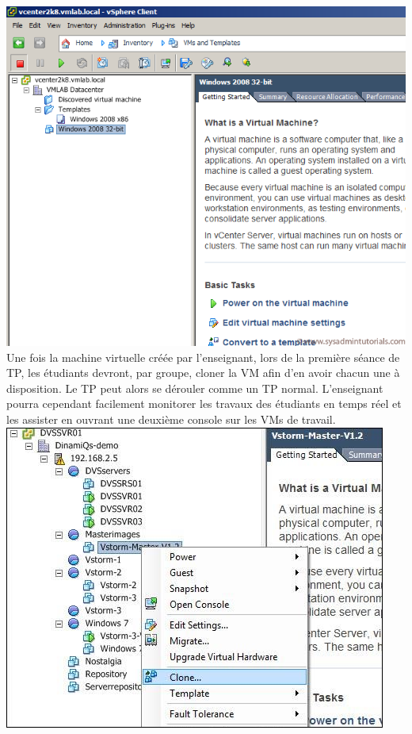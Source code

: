 \includegraphics[scale=0.3]{template2.png}\\

Une fois la machine virtuelle créée par l’enseignant, lors de la première séance de TP, les étudiants devront, par groupe, cloner la VM afin d’en avoir chacun une à disposition. Le TP peut alors se dérouler comme un TP normal. L’enseignant pourra cependant facilement monitorer les travaux des étudiants en temps réel et les assister en ouvrant une deuxième console sur les VMs de travail.\\

\includegraphics[scale=0.4]{clone.jpg}\\

